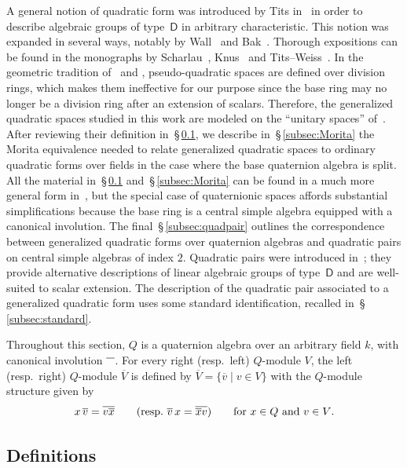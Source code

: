 \documentclass{amsart}
\newcommand{\invo}{\overline{\rule{2.5mm}{0mm}\rule{0mm}{4pt}}}
\theoremstyle{remark}
\begin{document}
A general notion of quadratic form was introduced by Tits
in~\cite{Tits} in order to 
describe algebraic groups of type~$\mathsf{D}$ in arbitrary characteristic.
This notion was expanded in
several ways, notably by Wall~\cite{Wall} and Bak~\cite{Bak}. Thorough
expositions can be found in the monographs by Scharlau~\cite{Sch},
Knus~\cite{Knus} and Tits--Weiss~\cite{TW}. In the geometric tradition
of~\cite{TitsBN} and \cite{TW}, pseudo-quadratic spaces are defined
over division rings, 
which makes them 
ineffective for our purpose since the base ring may no
longer be a division ring after an extension of scalars. Therefore,
the generalized quadratic spaces studied in this work are modeled on
the ``unitary spaces'' of~\cite{Knus}. After reviewing their
definition in~\S\,\ref{subsec:def}, we describe in~\S\,\ref{subsec:Morita}
the Morita equivalence needed to relate generalized quadratic spaces
to ordinary quadratic forms over fields in the case where the base
quaternion algebra is split. All the material in~\S\,\ref{subsec:def}
and~\S\,\ref{subsec:Morita} can be found in a much more general form
in~\cite{Knus}, but the special case of quaternionic spaces affords
substantial simplifications because the base ring is a central simple
algebra equipped with a canonical involution. The
final~\S\,\ref{subsec:quadpair} outlines the correspondence between
generalized quadratic forms over quaternion algebras and quadratic
pairs on central simple algebras of index $2$. Quadratic pairs were
introduced in~\cite{BoI}; they 
provide alternative descriptions of linear algebraic groups of
type~$\mathsf{D}$ and are well-suited to scalar extension. The
description of the quadratic pair associated to a generalized
quadratic form uses some standard identification, recalled
in~\S\,\ref{subsec:standard}.  
\medbreak

Throughout this section, $Q$ is a quaternion algebra over an arbitrary
field $k$, with canonical involution $\invo$. For every right (resp.\
left) $Q$-module $V$, the left (resp.\ right) $Q$-module $\overline V$
is defined by $\overline V = \{\overline v\mid v\in V\}$ with the
$Q$-module structure given by
\[
  x\,\overline v = \overline{v\overline x} \qquad\text{(resp.\
    $\overline v\,x = 
    \overline{\overline x v}$)} \qquad\text{for $x\in Q$ and $v\in
    V$.} 
\]

\subsection{Definitions}
\label{subsec:def}
\end{document}

